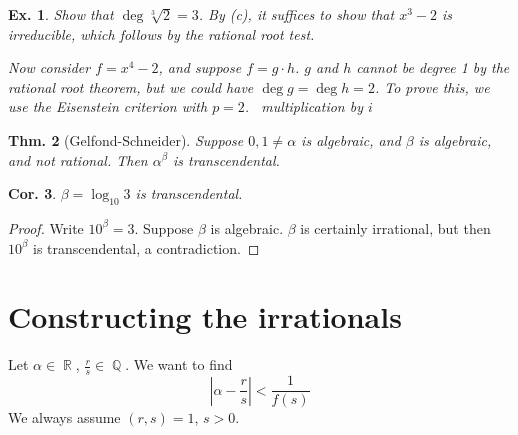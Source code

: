 \documentclass[12pt, a4paper]{book}
\DeclareMathOperator{\Q}{\mathbb{Q}}
\DeclareMathOperator{\R}{\mathbb{R}}
\newtheorem{theorem}{Thm.}[section]
\newtheorem{corollary}[theorem]{Cor.}
\newtheorem{example}[theorem]{Ex.}
\theoremstyle{nonumberplain}
\newtheorem{proof}{Proof}
\begin{document}
\begin{example}
    Show that $\deg\sqrt[3]{2}=3$.
    By (c), it suffices to show that $x^3-2$ is irreducible, which follows by the rational root test.

    Now consider $f=x^4-2$, and suppose $f=g\cdot h$.
    $g$ and $h$ cannot be degree 1 by the rational root theorem, but we could have $\deg g=\deg h=2$.
    To prove this, we use the Eisenstein criterion with $p=2$.
\ multiplication by $i$
\end{example}
\begin{theorem}[Gelfond-Schneider]
    Suppose $0,1\neq\alpha$ is algebraic, and $\beta$ is algebraic, and not rational.
    Then $\alpha^\beta$ is transcendental.
\end{theorem}
\begin{corollary}
    $\beta=\log_{10}3$ is transcendental.
\end{corollary}
\begin{proof}
    Write $10^\beta=3$.
    Suppose $\beta$ is algebraic.
    $\beta$ is certainly irrational, but then $10^\beta$ is transcendental, a contradiction.
\end{proof}
\section{Constructing the irrationals}
Let $\alpha\in\R$, $\frac{r}{s}\in\Q$.
We want to find
\[\left\lvert\alpha-\frac{r}{s}\right\rvert<\frac{1}{f(s)}\]
We always assume $(r,s)=1$, $s>0$.
\end{document}
